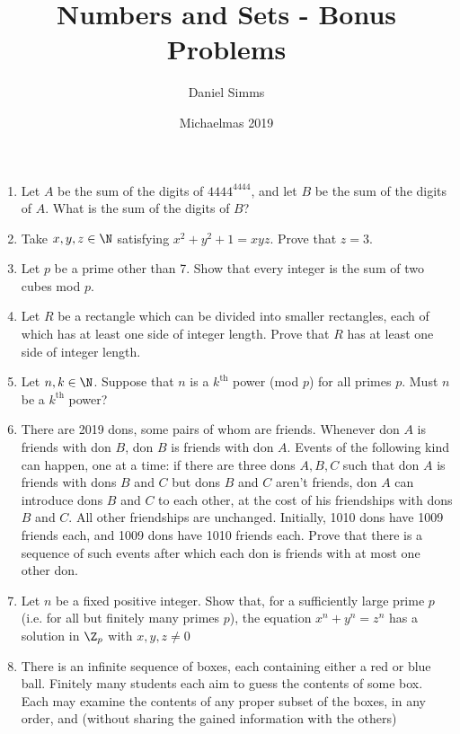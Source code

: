 \documentclass[12pt,a4paper]{article}
\author{Daniel Simms}
\date{Michaelmas 2019}
\title{Numbers and Sets - Bonus Problems}
\begin{document}
\maketitle

\begin{enumerate}
 \item Let \(A\) be the sum of the digits of \(4444^{4444}\), and let \(B\) be
       the sum of the digits of \(A\). What is the sum of the digits of \(B\)?
 \item Take \(x, y, z \in \N\) satisfying \(x^2 + y^2 + 1 = xyz\). Prove that
       \(z = 3\).
 \item Let \(p\) be a prime other than 7. Show that every integer is the sum of
       two cubes mod \(p\).
 \item Let \(R\) be a rectangle which can be divided into smaller rectangles,
       each of which has at least one side of integer length. Prove that \(R\)
       has at least one side of integer length.
 \item Let \(n, k \in \N\). Suppose that \(n\) is a \(k^{\mathrm{th}}\) power
       (mod \(p\)) for all primes \(p\). Must \(n\) be a \(k^{\mathrm{th}}\)
       power?
 \item There are 2019 dons, some pairs of whom are friends. Whenever don \(A\)
       is friends with don \(B\), don \(B\) is friends with don \(A\). Events of
       the following kind can happen, one at a time: if there are three dons
       \(A, B, C\) such that don \(A\) is friends with dons \(B\) and \(C\) but
       dons \(B\) and \(C\) aren't friends, don \(A\) can introduce dons \(B\)
       and \(C\) to each other, at the cost of his friendships with dons \(B\)
       and \(C\). All other friendships are unchanged. Initially, 1010 dons have
       1009 friends each, and 1009 dons have 1010 friends each. Prove that there
       is a sequence of such events after which each don is friends with at most
       one other don.
 \item Let \(n\) be a fixed positive integer. Show that, for a sufficiently
       large prime \(p\) (i.e. for all but finitely many primes \(p\)), the
       equation \(x^n + y ^n = z^n\) has a solution in \(\Z_p\) with
       \(x, y, z \ne 0\)
 \item There is an infinite sequence of boxes, each containing either a red or
       blue ball. Finitely many students each aim to guess the contents of some
       box. Each may examine the contents of any proper subset of the boxes, in
       any order, and (without sharing the gained information with the others)

\end{enumerate}
\end{document}

